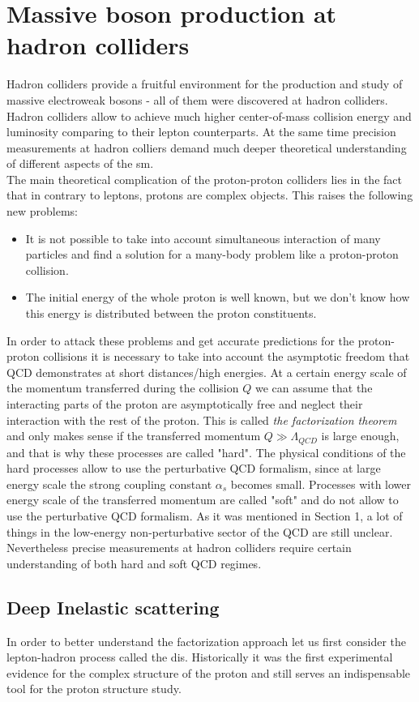         \section{Massive boson production at hadron colliders}
		Hadron colliders provide a fruitful environment for the production and study of massive electroweak bosons - all of them were discovered at hadron colliders. Hadron colliders allow to achieve much higher center-of-mass collision energy and luminosity comparing to their lepton counterparts. At the same time precision measurements at hadron colliers demand much deeper theoretical understanding of different aspects of the \gls{sm}. \\
		The main theoretical complication of the proton-proton colliders lies in the fact that in contrary to leptons, protons are complex objects. This raises the following new problems:
		\begin{itemize}
		\item It is not possible to take into account simultaneous interaction of many particles and find a solution for a many-body problem like a proton-proton collision.
		\item The initial energy of the whole proton is well known, but we don't know how this energy is distributed between the proton constituents.
		\end{itemize}
		In order to attack these problems and get accurate predictions for the proton-proton collisions it is necessary to take into account the asymptotic freedom that QCD demonstrates at short distances/high energies. At a certain energy scale of the momentum transferred during the collision $Q$ we can assume that the interacting parts of the proton are asymptotically free and neglect their interaction with the rest of the proton. This is called \textit{the factorization theorem} and only makes sense if the transferred momentum $Q\gg \Lambda_{QCD}$ is large enough, and that is why these processes are called "hard". The physical conditions of the hard processes allow to use the perturbative QCD formalism, since at large energy scale the strong coupling constant $\alpha_s$ becomes small. Processes with lower energy scale of the transferred momentum are called "soft" and do not allow to use the perturbative QCD formalism. As it was mentioned in Section 1, a lot of things in the low-energy non-perturbative sector of the QCD are still unclear. Nevertheless precise measurements at hadron colliders require certain understanding of both hard and soft QCD regimes.
		\subsection{Deep Inelastic scattering}
		In order to better understand the factorization approach let us first consider the lepton-hadron process called the \gls{dis}. Historically it was the first experimental evidence for the complex structure of the proton and still serves an indispensable tool for the proton structure study.
